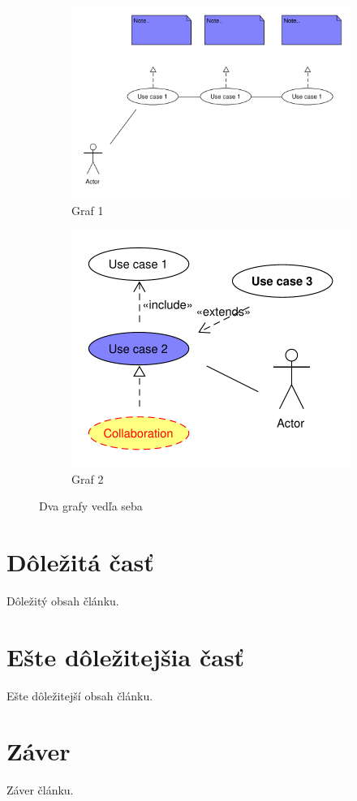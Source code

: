 \documentclass[10pt,twocolumn,twoside,slovak,a4paper]{article}
\begin{document}
\begin{figure}[h!]
\centering
\begin{subfigure}{.45\textwidth}
  \centering
  \includegraphics[width=\linewidth]{graf1.pdf} %
  \caption{Graf 1}
\end{subfigure}%
\hfill
\begin{subfigure}{.45\textwidth}
  \centering
  \includegraphics[width=\linewidth]{graf2.pdf} %
  \caption{Graf 2}
\end{subfigure}
\caption{Dva grafy vedľa seba}
\end{figure}


\section{Dôležitá časť} \label{dolezita}
Dôležitý obsah článku.

\section{Ešte dôležitejšia časť} \label{dolezitejsia}
Ešte dôležitejší obsah článku.

\section{Záver} \label{zaver}
Záver článku.

\end{document}
